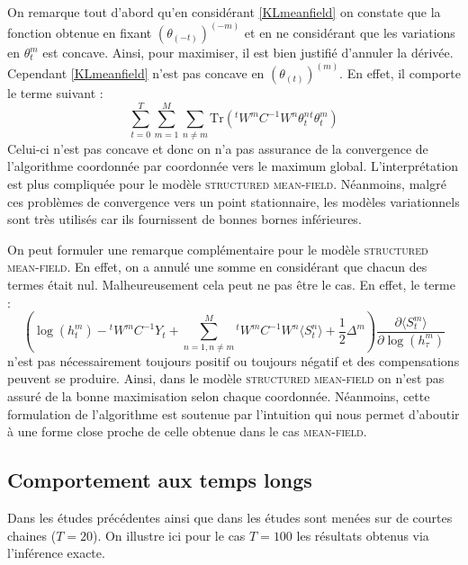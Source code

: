 \documentclass[10pt,a4paper]{article}
\newcommand{\meanfield}{\textsc{mean-field}}
\newcommand{\structmeanfield}{\textsc{structured mean-field}}
\begin{document}
 On remarque tout d'abord qu'en considérant \ref{KLmeanfield} on constate que la fonction obtenue en
 fixant $(\theta_{(-t)})^{(-m)}$ et en ne considérant que les variations en $\theta_t^m$ est concave.
 Ainsi, pour maximiser, il est bien justifié d'annuler la dérivée. Cependant \ref{KLmeanfield} n'est
 pas concave en $(\theta_{(t)})^{(m)}$. En effet, il comporte le terme suivant :
 \begin{equation}
 \underset{t=0}{\overset{T}{\sum}}\underset{m=1}{\overset{M}{\sum}}\underset{n \neq m}{\sum}
 \text{Tr}\left( {}^tW^m C^{-1}W^n\theta_t^n {}^t\theta_t^m\right)
 \end{equation}
 Celui-ci n'est pas concave et donc on n'a pas assurance de la convergence de l'algorithme 
 coordonnée par coordonnée vers le maximum global. L'interprétation est plus compliquée pour le
 modèle \structmeanfield. Néanmoins, malgré ces problèmes de convergence vers un point stationnaire, 
 les modèles variationnels sont très utilisés car ils fournissent de bonnes bornes inférieures.
 
 On peut formuler une remarque complémentaire pour le modèle \structmeanfield{}. En effet, on a annulé
 une somme en considérant que chacun des termes était nul. Malheureusement cela peut ne pas être le cas.
 En effet, le terme :
 \begin{equation}
 \left( 
\log(h_t^m) -{}^t W^mC^{-1}Y_t + \underset{n=1, n \neq 
m}{\overset{M}{\sum}}{}^t W^m C^{-1} W^n \langle S_t^n \rangle + 
\frac{1}{2}\Delta^m \right) \frac{\partial \langle S_t^m \rangle}{\partial 
\log(h_{\tau}^m)}
 \end{equation}
 n'est pas nécessairement toujours positif ou toujours négatif et des compensations peuvent se produire. Ainsi, dans le modèle \structmeanfield{} on n'est pas assuré de la bonne maximisation selon chaque coordonnée. Néanmoins, cette formulation de l'algorithme est soutenue par l'intuition qui nous permet 
 d'aboutir à une forme close proche de celle obtenue dans le cas \meanfield{}.

\subsection{Comportement aux temps longs}
 Dans les études précédentes ainsi que dans \cite{ghahramani1997factorial} les études sont menées sur de
  courtes chaines ($T=20$). On illustre ici pour le cas $T = 100$ les résultats obtenus via l'inférence 
  exacte.
  
\end{document}
